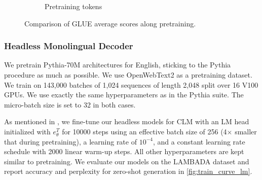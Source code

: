\begin{figure}
\begin{subfigure}[b]{0.40\columnwidth}
         \caption{Pretraining tokens}
         \label{fig:bert_compare_tokens}
    \end{subfigure}
    \caption{Comparison of GLUE average scores along pretraining.}
    \label{fig:train_curve_mlm}
\end{figure}



\subsubsection{Headless Monolingual Decoder}
\label{sec:mono_decoder}
We pretrain Pythia-70M architectures for English, sticking to the Pythia procedure \citep{biderman2023pythia} as much as possible. We use OpenWebText2 as a pretraining dataset. We train on 143,000 batches of 1,024 sequences of length 2,048 split over 16 V100 GPUs. We use exactly the same hyperparameters as in the Pythia suite. The micro-batch size is set to 32 in both cases.

%
As mentioned in , we fine-tune our headless models for CLM with an LM head initialized with $e_{\theta}^T$ for 10000 steps using an effective batch size of 256 (4$\times$ smaller that during pretraining), a learning rate of $10^{-4}$, and a constant learning rate schedule with 2000 linear warm-up steps. All other hyperparameters are kept similar to pretraining. We evaluate our models on the LAMBADA dataset and report accuracy and perplexity for zero-shot generation in \autoref{fig:train_curve_lm}.

